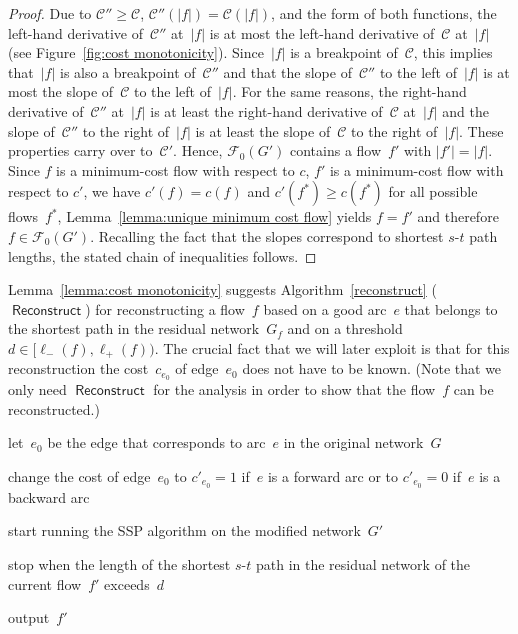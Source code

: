 \documentclass[11pt]{article}
\newcommand{\F}{\mathcal{F}}
\renewcommand{\sp}{\ell}
\newcommand{\COST}{\mathscr{C}}
\DeclareMathOperator{\Reconstruct}{\mathsf{Reconstruct}}
\newcommand{\spm}[1][]{\sp^{#1}_{-}}
\newcommand{\spp}[1][]{\sp^{#1}_{+}}
\begin{document}
\begin{proof}
Due to $\COST'' \geq \COST$, $\COST''(|f|) = \COST(|f|)$, and the form of both
functions, the left-hand derivative of~$\COST''$ at~$|f|$ is at most the
left-hand derivative of~$\COST$ at~$|f|$ (see Figure~\ref{fig:cost
monotonicity}). Since~$|f|$ is a breakpoint of~$\COST$, this implies that~$|f|$
is also a breakpoint of~$\COST''$ and that the slope of~$\COST''$ to the left 
of~$|f|$ is at most the slope of~$\COST$ to the left of~$|f|$.
For the same reasons, the right-hand derivative of~$\COST''$ at~$|f|$ is at
least the right-hand derivative of~$\COST$ at~$|f|$ and the slope 
of~$\COST''$ to the right of~$|f|$ is at least the slope of~$\COST$ to the right of~$|f|$.
These properties carry over to~$\COST'$. Hence, $\F_0(G')$ contains a flow~$f'$ with $|f'| = |f|$. Since $f$ is a minimum-cost flow with respect to $c$, $f'$ is a minimum-cost flow with respect to $c'$, we have $c'(f) = c(f)$ and $c'(f^*) \geq c(f^*)$ for all possible flows~$f^*$, Lemma~\ref{lemma:unique minimum cost flow} yields $f = f'$ and therefore $f \in \F_0(G')$. Recalling the fact that the slopes correspond
to shortest $s$-$t$ path lengths, the stated chain of inequalities follows.
\end{proof}

Lemma~\ref{lemma:cost monotonicity} suggests Algorithm~\ref{reconstruct} ($\Reconstruct$) for reconstructing a flow~$f$ based on a good arc~$e$ that belongs to the shortest path in the residual network~$G_f$ and on a threshold $d \in \big[ \spm(f), \spp(f) \big)$. The crucial fact that we will later exploit is that for this reconstruction the cost~$c_{e_0}$ of edge~$e_0$ does not have to be known.
(Note that we only need $\Reconstruct$ for the analysis in order to show that the flow~$f$ can be reconstructed.)

\begin{algorithm}[t]
  \caption{$\Reconstruct(e, d)$.}
  \begin{algorithmic}[1]
    \STATE let~$e_0$ be the edge that corresponds to arc~$e$ in the original network~$G$

    \STATE change the cost of edge~$e_0$ to $c'_{e_0} = 1$ if~$e$ is a forward arc or to $c'_{e_0} = 0$ if~$e$ is a backward arc

    \STATE start running the SSP algorithm on the modified network~$G'$

    \STATE stop when the length of the shortest $s$-$t$ path in the residual network of the current flow~$f'$ exceeds~$d$

    \STATE output~$f'$
  \end{algorithmic}
  \label{reconstruct}
\end{algorithm}
\end{document}
